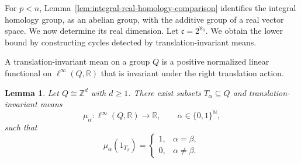 \documentclass[pdflatex,sn-mathphys-num]{sn-jnl}%
\theoremstyle{plain}
\newtheorem{lemma}[theorem]{Lemma}
\theoremstyle{remark}
\theoremstyle{definition}
\numberwithin{equation}{section}
\begin{document}
For \( p<n \), Lemma~\ref{lem:integral-real-homology-comparison} identifies the integral homology group, as an abelian group, with the additive group of a real vector space. We now determine its real dimension. Let \( \mathfrak c=2^{\aleph_0} \). We obtain the lower bound by constructing cycles detected by translation-invariant means.

A translation-invariant mean on a group \( Q \) is a positive normalized linear functional on \( \ell^\infty(Q,\mathbb R) \) that is invariant under the right translation action.

\begin{lemma}
\label{lem:separating-invariant-means}
Let \( Q\cong\mathbb Z^d \) with \( d\geq1 \). There exist subsets \( T_\alpha\subseteq Q \) and translation-invariant means
\[
\mu_\alpha\colon
\ell^\infty(Q,\mathbb R)
\longrightarrow
\mathbb R,
\qquad
\alpha\in\{0,1\}^{\mathbb N},
\]
such that
\begin{equation}
\label{eq:separating-means}
\mu_\alpha(1_{T_\beta})
=
\begin{cases}
1,
& \alpha=\beta,\\
0,
& \alpha\neq\beta.
\end{cases}
\end{equation}
\end{lemma}
\end{document}
